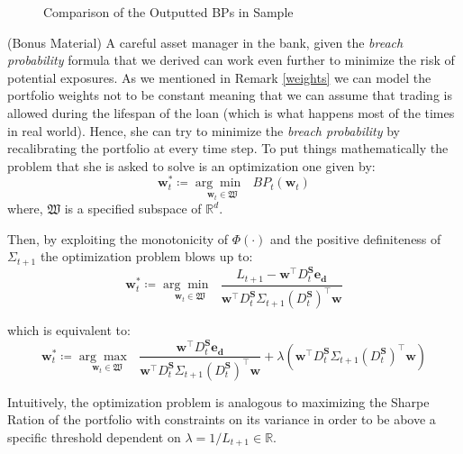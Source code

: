 \documentclass[a4paper, oneside]{discothesis}
\begin{document}
\begin{figure}[h]
    \centering
    \qquad
    \caption{Comparison of the Outputted BPs in Sample}
    \label{fig:bp}
\end{figure}

\begin{mdframed}
\begin{remark}(Bonus Material)
A careful asset manager in the bank, given the \textit{breach probability} formula that we derived can work even further to minimize the risk of potential exposures. As we mentioned in Remark \ref{weights} we can model the portfolio weights not to be constant meaning that we can assume that trading is allowed during the lifespan of the loan (which is what happens most of the times in real world). Hence, she can try to minimize the \textit{breach probability} by recalibrating the portfolio at every time step. To put things mathematically the problem that she is asked to solve is an optimization one given by:
\[\mathbf{w}^*_t\coloneqq\underset{\mathbf{w}_t\in\mathfrak{W}}{\arg\min\text{  }}BP_t(\mathbf{w}_t)\]
where, $\mathfrak{W}$ is a specified subspace of $\mathbb{R}^d$.

Then, by exploiting the monotonicity of $\Phi(\cdot)$ and the positive definiteness of $\Sigma_{t+1}$ the optimization problem blows up to:
\[\mathbf{w}^*_t\coloneqq\underset{\mathbf{w}_t\in\mathfrak{W}}{\arg\min\text{  }}\frac{L_{t+1}-\mathbf{w}^\intercal D^\mathbf{S}_t\mathbf{e_d}}{\mathbf{w}^\intercal D^\mathbf{S}_t\Sigma_{t+1} (D^\mathbf{S}_t)^\intercal \mathbf{w}}\]

which is equivalent to:
\[\mathbf{w}^*_t\coloneqq\underset{\mathbf{w}_t\in\mathfrak{W}}{\arg\max\text{  }}\frac{\mathbf{w}^\intercal D^\mathbf{S}_t\mathbf{e_d}}{\mathbf{w}^\intercal D^\mathbf{S}_t\Sigma_{t+1} (D^\mathbf{S}_t)^\intercal \mathbf{w}}+\lambda \left(\mathbf{w}^\intercal D^\mathbf{S}_t\Sigma_{t+1} (D^\mathbf{S}_t)^\intercal \mathbf{w}\right)\]

Intuitively, the optimization problem is analogous to maximizing the Sharpe Ration of the portfolio with constraints on its variance in order to be above a specific threshold dependent on $\lambda = 1/L_{t+1}\in \mathbb{R}$.
\end{remark}
\end{mdframed}
\end{document}
